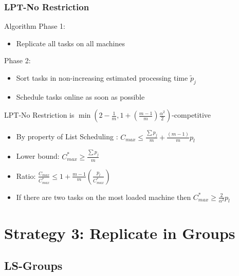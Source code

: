\documentclass[usenames,dvipsnames]{beamer}
\begin{document}
\begin{frame}
  \frametitle{LPT-No Restriction}

  \begin{block}{Algorithm}
    Phase 1:
    \begin{itemize}
    \item Replicate all tasks on all machines
    \end{itemize}
    Phase 2:
    \begin{itemize}
    \item Sort tasks in non-increasing estimated processing time $\tilde{p}_j$
    \item Schedule tasks online as soon as possible
    \end{itemize}
  \end{block}
  
  \pause

  \begin{block}{LPT-No Restriction is $\min(2-\frac{1}{m}, 1 + (\frac{m-1}{m}) \frac{\alpha^{2}}{2})$-competitive}
    \begin{itemize}
    \item By property of List Scheduling : $C_{max} \leq  \frac{\sum {p_j}}{m} + \frac{(m-1)}{m}p_l$
    \item Lower bound: $C_{max}^{*}\geq\frac{\sum p_j}{m}$
    \item Ratio: $\frac{C_{max}}{C_{max}^{*}} \leq 1 + {\frac{m-1}{m}}\left(\frac{p_l}{C_{max}^{*}}\right)$
    \item If there are two tasks on the most loaded machine then $C_{max}^* \geq {\frac{2}{\alpha^{2}}} p_l$
    \end{itemize}
  \end{block}  
\end{frame}

\section{Strategy 3: Replicate in Groups}

\subsection{LS-Groups}
\end{document}

